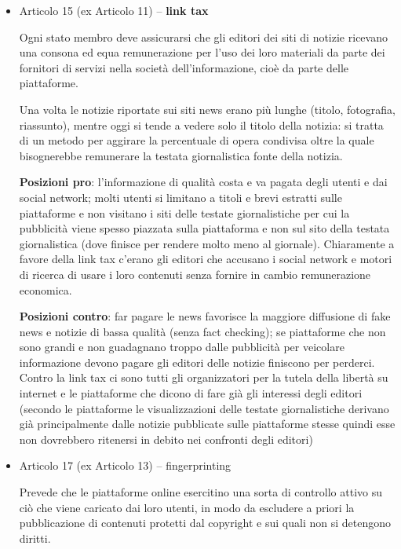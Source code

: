 \begin{itemize}
    \item Articolo 15 (ex Articolo 11) -- \textbf{link tax}
    
    Ogni stato membro deve assicurarsi che gli editori dei siti di notizie ricevano una consona ed equa remunerazione per l'uso dei loro materiali da parte dei fornitori di servizi nella società dell'informazione, cioè da parte delle piattaforme.

    Una volta le notizie riportate sui siti news erano più lunghe (titolo, fotografia, riassunto), mentre oggi si tende a vedere solo il titolo della notizia: si tratta di un metodo per aggirare la percentuale di opera condivisa oltre la quale bisognerebbe remunerare la testata giornalistica fonte della notizia.
    
    \textbf{Posizioni pro}: l'informazione di qualità costa e va pagata degli utenti e dai social network; molti utenti si limitano a titoli e brevi estratti sulle piattaforme e non visitano i siti delle testate giornalistiche per cui la pubblicità viene spesso piazzata sulla piattaforma e non sul sito della testata giornalistica (dove finisce per rendere molto meno al giornale). Chiaramente a favore della link tax c'erano gli editori che accusano i social network e motori di ricerca di usare i loro contenuti senza fornire in cambio remunerazione economica.
    
   \textbf{Posizioni contro}: far pagare le news favorisce la maggiore diffusione di fake news e notizie di bassa qualità (senza fact checking); se piattaforme che non sono grandi e non guadagnano troppo dalle pubblicità per veicolare informazione devono pagare gli editori delle notizie finiscono per perderci. Contro la link tax ci sono tutti gli organizzatori per la tutela della libertà su internet e le piattaforme che dicono di fare già gli interessi degli editori (secondo le piattaforme le visualizzazioni delle testate giornalistiche derivano già principalmente dalle notizie pubblicate sulle piattaforme stesse quindi esse non dovrebbero ritenersi in debito nei confronti degli editori)

   \item Articolo 17 (ex Articolo 13) -- fingerprinting
   
   Prevede che le piattaforme online esercitino una sorta di controllo attivo su ciò che viene caricato dai loro utenti, in modo da escludere a priori la pubblicazione di contenuti protetti dal copyright e sui quali non si detengono diritti. 


\end{itemize}
